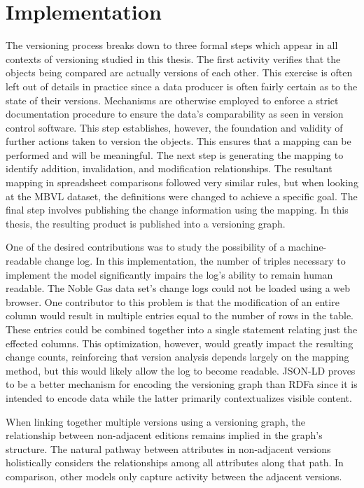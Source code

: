 \section{Implementation}

The versioning process breaks down to three formal steps which appear in all contexts of versioning studied in this thesis.
The first activity verifies that the objects being compared are actually versions of each other.
This exercise is often left out of details in practice since a data producer is often fairly certain as to the state of their versions.
Mechanisms are otherwise employed to enforce a strict documentation procedure to ensure the data's comparability as seen in version control software.
This step establishes, however, the foundation and validity of further actions taken to version the objects.
This ensures that a mapping can be performed and will be meaningful.
The next step is generating the mapping to identify addition, invalidation, and modification relationships.
The resultant mapping in spreadsheet comparisons followed very similar rules, but when looking at the MBVL dataset, the definitions were changed to achieve a specific goal.
The final step involves publishing the change information using the mapping.
In this thesis, the resulting product is published into a versioning graph.

One of the desired contributions was to study the possibility of a machine-readable change log.
In this implementation, the number of triples necessary to implement the model significantly impairs the log's ability to remain human readable.
The Noble Gas data set's change logs could not be loaded using a web browser.
One contributor to this problem is that the modification of an entire column would result in multiple entries equal to the number of rows in the table.
These entries could be combined together into a single statement relating just the effected columns.
This optimization, however, would greatly impact the resulting change counts, reinforcing that version analysis depends largely on the mapping method, but this would likely allow the log to become readable.
JSON-LD proves to be a better mechanism for encoding the versioning graph than RDFa since it is intended to encode data while the latter primarily contextualizes visible content.

When linking together multiple versions using a versioning graph, the relationship between non-adjacent editions remains implied in the graph's structure.
The natural pathway between attributes in non-adjacent versions holistically considers the relationships among all attributes along that path.
In comparison, other models only capture activity between the adjacent versions.

